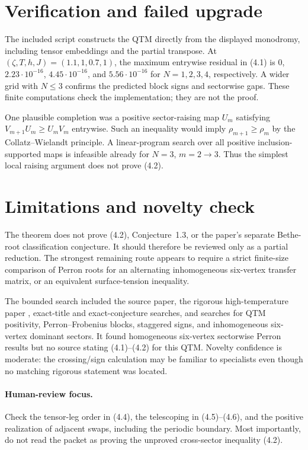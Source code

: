\documentclass[11pt]{article}
\begin{document}
\section{Verification and failed upgrade}

The included script constructs the QTM directly from the displayed monodromy,
including tensor embeddings and the partial transpose.  At
$(\zeta,T,h,J)=(1.1,1,0.7,1)$, the maximum entrywise residual in (4.1) is
$0$, $2.23\cdot10^{-16}$, $4.45\cdot10^{-16}$, and
$5.56\cdot10^{-16}$ for $N=1,2,3,4$, respectively.  A wider grid with
$N\leq3$ confirms the predicted block signs and sectorwise gaps.  These
finite computations check the implementation; they are not the proof.

One plausible completion was a positive sector-raising map $U_m$ satisfying
$V_{m+1}U_m\geq U_mV_m$ entrywise.  Such an inequality would imply
$\rho_{m+1}\geq\rho_m$ by the Collatz--Wielandt principle.  A linear-program
search over all positive inclusion-supported maps is infeasible already for
$N=3$, $m=2\to3$.  Thus the simplest local raising argument does not prove
(4.2).

\section{Limitations and novelty check}

The theorem does not prove (4.2), Conjecture~1.3, or the paper's separate
Bethe-root classification conjecture.  It should therefore be reviewed only
as a partial reduction.  The strongest remaining route appears to require a
strict finite-size comparison of Perron roots for an alternating
inhomogeneous six-vertex transfer matrix, or an equivalent surface-tension
inequality.

The bounded search included the source paper, the rigorous high-temperature
paper \cite{GGKS}, exact-title and exact-conjecture searches, and searches for
QTM positivity, Perron--Frobenius blocks, staggered signs, and inhomogeneous
six-vertex dominant sectors.  It found homogeneous six-vertex sectorwise
Perron results but no source stating (4.1)--(4.2) for this QTM.  Novelty
confidence is moderate: the crossing/sign calculation may be familiar to
specialists even though no matching rigorous statement was located.

\paragraph{Human-review focus.}
Check the tensor-leg order in (4.4), the telescoping in (4.5)--(4.6), and the
positive realization of adjacent swaps, including the periodic boundary.
Most importantly, do not read the packet as proving the unproved
cross-sector inequality (4.2).
\end{document}
